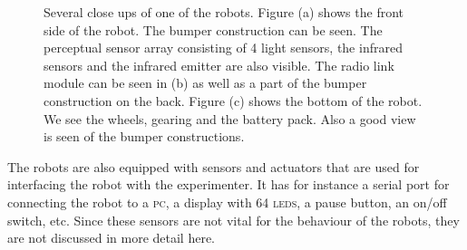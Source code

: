 \begin{figure}
	\centering
	\caption{Several close ups of one of the robots. Figure (a) shows the front side of the robot. The bumper construction can be seen. The perceptual sensor array consisting of 4 light sensors, the infrared sensors and the infrared emitter are also visible. The radio link module can be seen in (b) as well as a part of the bumper construction on the back. Figure (c) shows the bottom of the robot. We see the wheels, gearing and the battery pack. Also a good view is seen of the bumper constructions.}
\end{figure}

The robots are also equipped with sensors and actuators that are used for interfacing the robot with the experimenter. It has for instance a serial port for connecting the robot to a {\scshape pc}, a display with 64 \textsc{leds}, a pause button, an on/off switch, etc. Since these sensors are not vital for the behaviour of the robots, they are not discussed in more detail here. 


